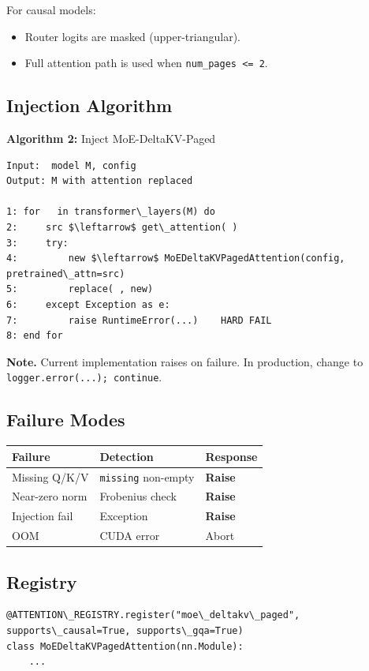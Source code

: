 For causal models:
\begin{itemize}
\item Router logits are masked (upper-triangular).
\item Full attention path is used when \texttt{num\_pages \textless{}= 2}.

\end{itemize}
\subsection{Injection Algorithm}

\textbf{Algorithm 2:} Inject MoE-DeltaKV-Paged
\begin{lstlisting}
Input:  model M, config
Output: M with attention replaced

1: for   in transformer\_layers(M) do
2:     src $\leftarrow$ get\_attention( )
3:     try:
4:         new $\leftarrow$ MoEDeltaKVPagedAttention(config, pretrained\_attn=src)
5:         replace( , new)
6:     except Exception as e:
7:         raise RuntimeError(...)    HARD FAIL
8: end for
\end{lstlisting}

\textbf{Note.} Current implementation raises on failure. In production, change 
to \texttt{logger.error(...); continue}.

\subsection{Failure Modes}

\begin{table}[H]
\centering
\small
\begin{tabular}{lll}
\toprule
\textbf{Failure} & \textbf{Detection} & \textbf{Response} \\
\midrule
Missing Q/K/V & \texttt{missing} non-empty & \textbf{Raise} \\
Near-zero norm & Frobenius check & \textbf{Raise} \\
Injection fail & Exception & \textbf{Raise} \\
OOM & CUDA error & Abort \\
\bottomrule
\end{tabular}
\end{table}

\subsection{Registry}

\begin{lstlisting}
@ATTENTION\_REGISTRY.register("moe\_deltakv\_paged", supports\_causal=True, supports\_gqa=True)
class MoEDeltaKVPagedAttention(nn.Module):
    ...
\end{lstlisting}

